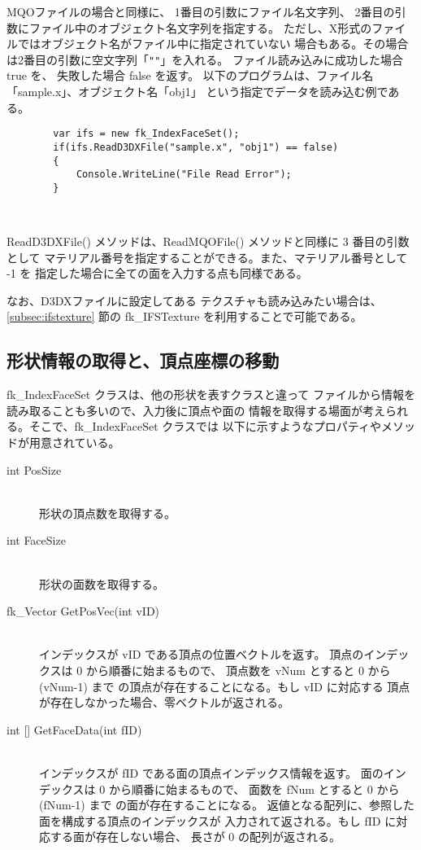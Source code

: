 MQOファイルの場合と同様に、
1番目の引数にファイル名文字列、
2番目の引数にファイル中のオブジェクト名文字列を指定する。
ただし、X形式のファイルではオブジェクト名がファイル中に指定されていない
場合もある。その場合は2番目の引数に空文字列「\verb+""+」を入れる。
ファイル読み込みに成功した場合 true を、
失敗した場合 false を返す。
以下のプログラムは、ファイル名「sample.x」、オブジェクト名「obj1」
という指定でデータを読み込む例である。
\\
\begin{screen}
\begin{verbatim}
        var ifs = new fk_IndexFaceSet();
        if(ifs.ReadD3DXFile("sample.x", "obj1") == false)
        {
            Console.WriteLine("File Read Error");
        }
\end{verbatim}
\end{screen} ~

ReadD3DXFile() メソッドは、ReadMQOFile() メソッドと同様に 3 番目の引数として
マテリアル番号を指定することができる。また、マテリアル番号として -1 を
指定した場合に全ての面を入力する点も同様である。

なお、D3DXファイルに設定してある
テクスチャも読み込みたい場合は、\ref{subsec:ifstexture} 節の
fk\_IFSTexture を利用することで可能である。

\subsection{形状情報の取得と、頂点座標の移動}
fk\_IndexFaceSet クラスは、他の形状を表すクラスと違って
ファイルから情報を読み取ることも多いので、入力後に頂点や面の
情報を取得する場面が考えられる。そこで、fk\_IndexFaceSet クラスでは
以下に示すようなプロパティやメソッドが用意されている。
\begin{description}
\item[int PosSize] ~ \\
	形状の頂点数を取得する。\\

\item[int FaceSize] ~ \\
	形状の面数を取得する。\\

\item[fk\_Vector GetPosVec(int vID)] ~ \\
	インデックスが vID である頂点の位置ベクトルを返す。
	頂点のインデックスは 0 から順番に始まるもので、
	頂点数を vNum とすると 0 から (vNum-1) まで
	の頂点が存在することになる。もし vID に対応する
	頂点が存在しなかった場合、零ベクトルが返される。\\

\item[int {[]} GetFaceData(int fID)] ~ \\
	インデックスが fID である面の頂点インデックス情報を返す。
	面のインデックスは 0 から順番に始まるもので、
	面数を fNum とすると 0 から (fNum-1) まで
	の面が存在することになる。
	返値となる配列に、参照した面を構成する頂点のインデックスが
	入力されて返される。もし fID に対応する面が存在しない場合、
	長さが 0 の配列が返される。
\end{description}

